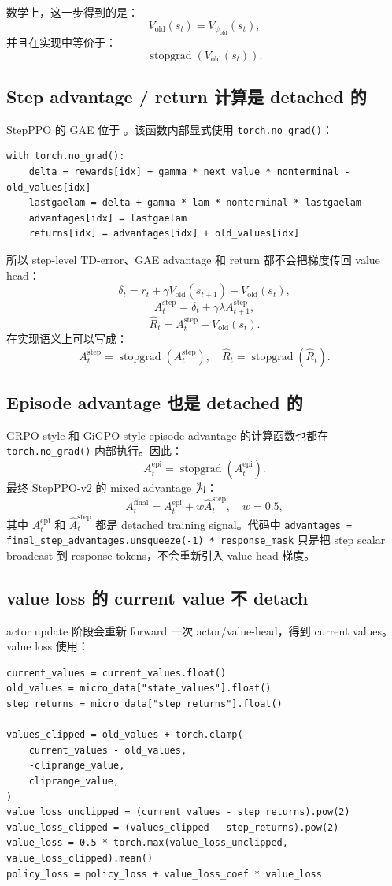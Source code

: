 \documentclass[10pt]{ctexart}
\newcommand{\code}[1]{\texttt{#1}}
\begin{document}
数学上，这一步得到的是：
\[
V_{\mathrm{old}}(s_t)=V_{\psi_{\mathrm{old}}}(s_t),
\]
并且在实现中等价于：
\[
\operatorname{stopgrad}\left(V_{\mathrm{old}}(s_t)\right).
\]

\subsection*{Step advantage / return 计算是 detached 的}
StepPPO 的 GAE 位于 。该函数内部显式使用 \code{torch.no\_grad()}：
\begin{Verbatim}[breaklines=true,breakanywhere=true]
with torch.no_grad():
    delta = rewards[idx] + gamma * next_value * nonterminal - old_values[idx]
    lastgaelam = delta + gamma * lam * nonterminal * lastgaelam
    advantages[idx] = lastgaelam
    returns[idx] = advantages[idx] + old_values[idx]
\end{Verbatim}

所以 step-level TD-error、GAE advantage 和 return 都不会把梯度传回 value head：
\[
\delta_t
= r_t + \gamma V_{\mathrm{old}}(s_{t+1}) - V_{\mathrm{old}}(s_t),
\]
\[
A_t^{\mathrm{step}}
= \delta_t + \gamma\lambda A_{t+1}^{\mathrm{step}},
\]
\[
\hat R_t
= A_t^{\mathrm{step}} + V_{\mathrm{old}}(s_t).
\]
在实现语义上可以写成：
\[
A_t^{\mathrm{step}}
=\operatorname{stopgrad}\left(A_t^{\mathrm{step}}\right),
\quad
\hat R_t=\operatorname{stopgrad}(\hat R_t).
\]

\subsection*{Episode advantage 也是 detached 的}
GRPO-style 和 GiGPO-style episode advantage 的计算函数也都在 \code{torch.no\_grad()} 内部执行。因此：
\[
A_t^{\mathrm{epi}}
=\operatorname{stopgrad}\left(A_t^{\mathrm{epi}}\right).
\]
最终 StepPPO-v2 的 mixed advantage 为：
\[
A_t^{\mathrm{final}}
= A_t^{\mathrm{epi}} + w\widehat A_t^{\mathrm{step}},
\quad w=0.5,
\]
其中 \(A_t^{\mathrm{epi}}\) 和 \(\widehat A_t^{\mathrm{step}}\) 都是 detached training signal。代码中 \code{advantages = final\_step\_advantages.unsqueeze(-1) * response\_mask} 只是把 step scalar broadcast 到 response tokens，不会重新引入 value-head 梯度。

\subsection*{value loss 的 current value 不 detach}
actor update 阶段会重新 forward 一次 actor/value-head，得到 current values。value loss 使用：
\begin{Verbatim}[breaklines=true,breakanywhere=true]
current_values = current_values.float()
old_values = micro_data["state_values"].float()
step_returns = micro_data["step_returns"].float()

values_clipped = old_values + torch.clamp(
    current_values - old_values,
    -cliprange_value,
    cliprange_value,
)
value_loss_unclipped = (current_values - step_returns).pow(2)
value_loss_clipped = (values_clipped - step_returns).pow(2)
value_loss = 0.5 * torch.max(value_loss_unclipped, value_loss_clipped).mean()
policy_loss = policy_loss + value_loss_coef * value_loss
\end{Verbatim}
\end{document}
